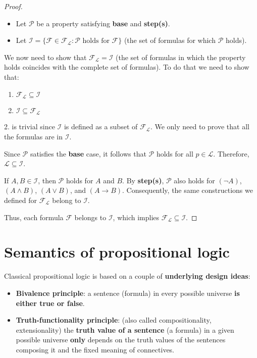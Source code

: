 	\begin{proof} \hspace{1cm}
	\begin{itemize}
		\item Let $\mathcal{P}$ be a property satisfying \textbf{base} and \textbf{step(s)}.
		\item Let $\mathcal{I} = \{\mathcal{F} \in \mathcal{F}_{\mathcal{L}}: \mathcal{P} \text{ holds for } \mathcal{F}\}$ (the set of formulas for which $\mathcal{P}$ holds).
	\end{itemize}

	We now need to show that $\mathcal{F}_{\mathcal{L}} = \mathcal{I}$ (the set of formulas in which the property holds coincides with the complete set of formulas).
		To do that we need to show that:
		\begin{enumerate}
			\item $\mathcal{F}_{\mathcal{L}} \subseteq \mathcal{I}$
			\item $\mathcal{I} \subseteq \mathcal{F}_{\mathcal{L}}$
		\end{enumerate}
		2. is trivial since $\mathcal{I}$ is defined as a subset of $\mathcal{F}_{\mathcal{L}}$. We only need to prove that all the formulas are in $\mathcal{I}$.

		Since \(\mathcal{P}\) satisfies the \textbf{base} case, it follows that \(\mathcal{P}\) holds for all \(p \in \mathcal{L}\). Therefore, \(\mathcal{L} \subseteq \mathcal{I}\).

		If \(A, B \in \mathcal{I}\), then \(\mathcal{P}\) holds for \(A\) and \(B\). By \textbf{step(s)}, \(\mathcal{P}\) also holds for \((\neg A)\), \((A \wedge B)\), \((A \vee B)\), and \((A \rightarrow B)\). Consequently, the same constructions we defined for \(\mathcal{F}_{\mathcal{L}}\) belong to \(\mathcal{I}\).

		Thus, each formula \(\mathcal{F}\) belongs to \(\mathcal{I}\), which implies \(\mathcal{F}_{\mathcal{L}} \subseteq \mathcal{I}\).
	\end{proof}

	\section{Semantics of propositional logic}

	Classical propositional logic is based on a couple of \textbf{underlying design ideas}:
	\begin{itemize}
		\item \textbf{Bivalence principle}: a sentence (formula) in every possible universe \textbf{is either true or false}.
		\item \textbf{Truth-functionality principle}: (also called compositionality, extensionality) the \textbf{truth value of a sentence} (a formula) in a given possible universe \textbf{only} depends on the truth values of the sentences composing it and the fixed meaning of connectives.
	\end{itemize}


